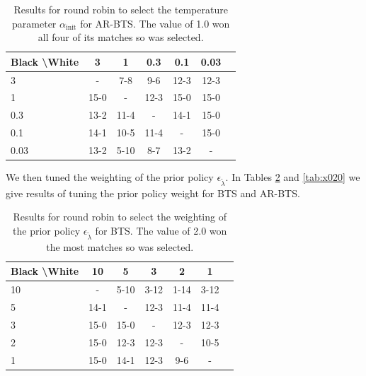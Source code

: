\documentclass{article}
\theoremstyle{plain}
\begin{document}
\begin{appendices}
            \begin{table}[]
            \centering
                \begin{tabular}{l|cccccc}
                    \textbf{Black \textbackslash White}     & 3  & 1   & 0.3   & 0.1    & 0.03    \\ 
                    \hline
                                            3            & -     	& 7-8  		& 9-6  		&  12-3 		& 12-3  		\\
                                            1            & 15-0 & - & 12-3 & 15-0 & 15-0   		\\
                                            0.3          & 13-2 & 11-4 & - & 14-1 & 15-0  		\\
                                            0.1          & 14-1 & 10-5 & 11-4 & - & 15-0   		\\
                                            0.03         & 13-2 & 5-10 & 8-7 & 13-2 &   -   	\\    
                \end{tabular}
                \caption{Results for round robin to select the temperature parameter $\alpha_{\text{init}}$ for AR-BTS. The value of 1.0 won all four of its matches so was selected. \label{tab:x001}}
            \end{table}
            
            
            
            
            
            
            We then tuned the weighting of the prior policy $\epsilon_{\tilde{\lambda}}$. In Tables \ref{tab:w020} and \ref{tab:x020} we give results of tuning the prior policy weight for BTS and AR-BTS.
            
            \begin{table}[]
            \centering
                \begin{tabular}{l|cccccc}
                    \textbf{Black \textbackslash White}     & 10  & 5   & 3   & 2    & 1    \\ 
                    \hline
                                            10            & - & 5-10 & 3-12 & 1-14 &  3-12  		\\
                                            5            & 14-1 & - & 12-3 & 11-4 & 11-4   		\\
                                            3          & 15-0 & 15-0 & - & 12-3 & 12-3   		\\
                                            2          & 15-0 & 12-3 & 12-3 & - & 10-5   		\\
                                            1         & 15-0 & 14-1 & 12-3 & 9-6 &   -   	\\    
                \end{tabular}
                \caption{Results for round robin to select the weighting of the prior policy $\epsilon_{\tilde{\lambda}}$ for BTS. The value of 2.0 won the most matches so was selected. \label{tab:w020}}
            \end{table}
            

\end{appendices}
\end{document}
